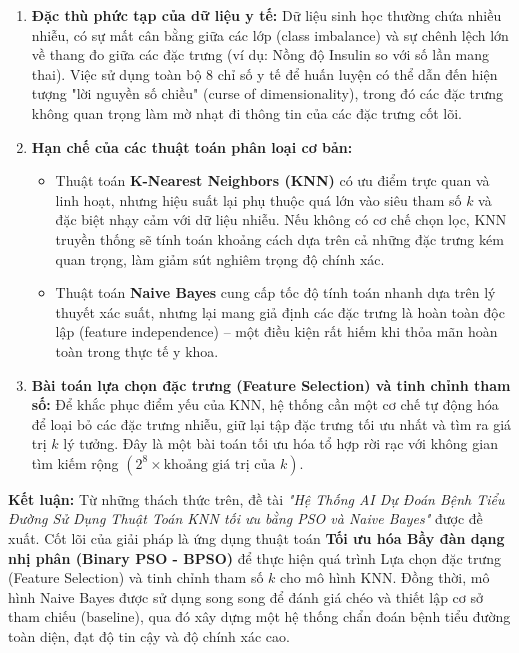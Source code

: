 \documentclass[a4paper,12pt]{report}
\begin{document}
\begin{enumerate}
    \item \textbf{Đặc thù phức tạp của dữ liệu y tế:} 
    Dữ liệu sinh học thường chứa nhiều nhiễu, có sự mất cân bằng giữa các lớp (class imbalance) và sự chênh lệch lớn về thang đo giữa các đặc trưng (ví dụ: Nồng độ Insulin so với số lần mang thai). Việc sử dụng toàn bộ 8 chỉ số y tế để huấn luyện có thể dẫn đến hiện tượng "lời nguyền số chiều" (curse of dimensionality), trong đó các đặc trưng không quan trọng làm mờ nhạt đi thông tin của các đặc trưng cốt lõi.

    \item \textbf{Hạn chế của các thuật toán phân loại cơ bản:} 
    \begin{itemize}
        \item Thuật toán \textbf{K-Nearest Neighbors (KNN)} có ưu điểm trực quan và linh hoạt, nhưng hiệu suất lại phụ thuộc quá lớn vào siêu tham số $k$ và đặc biệt nhạy cảm với dữ liệu nhiễu. Nếu không có cơ chế chọn lọc, KNN truyền thống sẽ tính toán khoảng cách dựa trên cả những đặc trưng kém quan trọng, làm giảm sút nghiêm trọng độ chính xác.
        \item Thuật toán \textbf{Naive Bayes} cung cấp tốc độ tính toán nhanh dựa trên lý thuyết xác suất, nhưng lại mang giả định các đặc trưng là hoàn toàn độc lập (feature independence) – một điều kiện rất hiếm khi thỏa mãn hoàn toàn trong thực tế y khoa.
    \end{itemize}

    \item \textbf{Bài toán lựa chọn đặc trưng (Feature Selection) và tinh chỉnh tham số:} 
    Để khắc phục điểm yếu của KNN, hệ thống cần một cơ chế tự động hóa để loại bỏ các đặc trưng nhiễu, giữ lại tập đặc trưng tối ưu nhất và tìm ra giá trị $k$ lý tưởng. Đây là một bài toán tối ưu hóa tổ hợp rời rạc với không gian tìm kiếm rộng $\left(2^8 \times \text{khoảng giá trị của } k\right)$.
\end{enumerate}

\textbf{Kết luận:} 
Từ những thách thức trên, đề tài \textit{"Hệ Thống AI Dự Đoán Bệnh Tiểu Đường Sử Dụng Thuật Toán KNN tối ưu bằng PSO và Naive Bayes"} được đề xuất. Cốt lõi của giải pháp là ứng dụng thuật toán \textbf{Tối ưu hóa Bầy đàn dạng nhị phân (Binary PSO - BPSO)} để thực hiện quá trình Lựa chọn đặc trưng (Feature Selection) và tinh chỉnh tham số $k$ cho mô hình KNN. Đồng thời, mô hình Naive Bayes được sử dụng song song để đánh giá chéo và thiết lập cơ sở tham chiếu (baseline), qua đó xây dựng một hệ thống chẩn đoán bệnh tiểu đường toàn diện, đạt độ tin cậy và độ chính xác cao.
\end{document}
